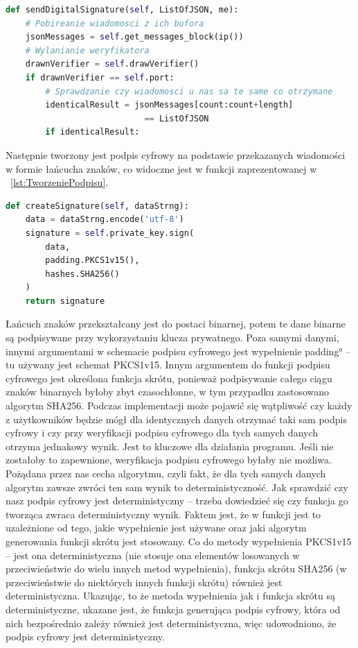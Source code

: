 \begin{lstlisting}[language=Python, extendedchars=true, caption={Funkcja wysyłania podpisu weryfikatora}, label={lst:WysylaniePodpisu}]
def sendDigitalSignature(self, ListOfJSON, me):
    # Pobireanie wiadomosci z ich bufora
    jsonMessages = self.get_messages_block(ip())
    # Wylanianie weryfikatora
    drawnVerifier = self.drawVerifier()
    if drawnVerifier == self.port:
        # Sprawdzanie czy wiadomosci u nas sa te same co otrzymane 
        identicalResult = jsonMessages[count:count+length]
                            == ListOfJSON
        if identicalResult:
\end{lstlisting}

Następnie tworzony jest podpis cyfrowy na podstawie przekazanych wiadomości w formie łańcucha znaków, co widoczne jest w funkcji zaprezentowanej w \lstlistingname{~\ref{lst:TworzeniePodpisu}}.

\begin{lstlisting}[language=Python, extendedchars=true, caption={Funkcja tworzenia podpisu weryfikatora}, label={lst:TworzeniePodpisu}]
def createSignature(self, dataStrng):
    data = dataStrng.encode('utf-8')
    signature = self.private_key.sign(
        data,
        padding.PKCS1v15(),
        hashes.SHA256()
    )
    return signature
\end{lstlisting}
 Łańcuch znaków przekształcany jest do postaci binarnej, potem te dane binarne są podpisywane przy wykorzystaniu klucza prywatnego. Poza samymi danymi, innymi argumentami w schemacie podpisu cyfrowego jest wypełnienie \ang{padding} – tu używany jest schemat PKCS1v15. Innym argumentem do funkcji podpisu cyfrowego jest określona funkcja skrótu, ponieważ podpisywanie całego ciągu znaków binarnych byłoby zbyt czasochłonne, w tym przypadku zastosowano algorytm SHA256. Podczas implementacji może pojawić się wątpliwość czy każdy z użytkowników będzie mógł dla identycznych danych otrzymać taki sam podpis cyfrowy i czy przy weryfikacji podpisu cyfrowego dla tych samych danych otrzyma jednakowy wynik. Jest to kluczowe dla działania programu. Jeśli nie zostałoby to zapewnione, weryfikacja podpisu cyfrowego byłaby nie możliwa. Pożądana przez nas cecha algorytmu, czyli fakt, że dla tych samych danych algorytm zawsze zwróci ten sam wynik to deterministyczność. Jak sprawdzić czy nasz podpis cyfrowy jest deterministyczny – trzeba dowiedzieć się czy funkcja go tworząca zwraca deterministyczny wynik. Faktem jest, że w funkcji jest to uzależnione od tego, jakie wypełnienie jest używane oraz jaki algorytm generowania funkcji skrótu jest stosowany. Co do metody wypełnienia PKCS1v15 – jest ona deterministyczna (nie stosuje ona elementów losowanych w przeciwieństwie do wielu innych metod wypełnienia), funkcja skrótu SHA256 (w przeciwieństwie do niektórych innych funkcji skrótu) również jest deterministyczna. Ukazując, to że metoda wypełnienia jak i funkcja skrótu są deterministyczne, ukazane jest, że funkcja generująca podpis cyfrowy, która od nich bezpośrednio zależy również jest deterministyczna, więc udowodniono, że podpis cyfrowy jest deterministyczny.

